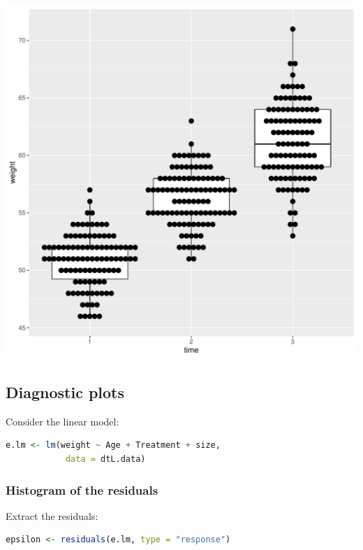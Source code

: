 \documentclass{article}
\begin{document}
\begin{center}
\includegraphics[width=.9\linewidth]{./figures/fig-hist.pdf}
\label{}
\end{center}
\subsection{Diagnostic plots}
\label{sec:org481b34d}

Consider the linear model:
\begin{lstlisting}[language=r,numbers=none]
e.lm <- lm(weight ~ Age + Treatment + size,
            data = dtL.data)
\end{lstlisting}
\subsubsection{Histogram of the residuals}
\label{sec:orga11df72}

Extract the residuals:
\begin{lstlisting}[language=r,numbers=none]
epsilon <- residuals(e.lm, type = "response")
\end{lstlisting}
\end{document}
